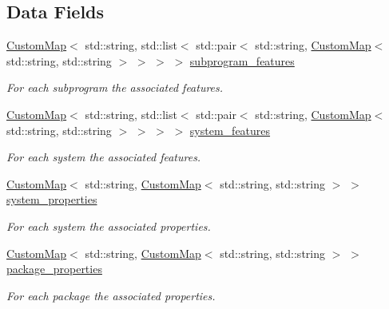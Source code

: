 \subsection*{Data Fields}
\begin{DoxyCompactItemize}
\item 
\hyperlink{custom__map_8hpp_a18ca01763abbe3e5623223bfe5aaac6b}{Custom\+Map}$<$ std\+::string, std\+::list$<$ std\+::pair$<$ std\+::string, \hyperlink{custom__map_8hpp_a18ca01763abbe3e5623223bfe5aaac6b}{Custom\+Map}$<$ std\+::string, std\+::string $>$ $>$ $>$ $>$ \hyperlink{structAadlParserData_a04950aa5522cb22c90023d3c7c2fefab}{subprogram\+\_\+features}
\begin{DoxyCompactList}\small\item\em For each subprogram the associated features. \end{DoxyCompactList}\item 
\hyperlink{custom__map_8hpp_a18ca01763abbe3e5623223bfe5aaac6b}{Custom\+Map}$<$ std\+::string, std\+::list$<$ std\+::pair$<$ std\+::string, \hyperlink{custom__map_8hpp_a18ca01763abbe3e5623223bfe5aaac6b}{Custom\+Map}$<$ std\+::string, std\+::string $>$ $>$ $>$ $>$ \hyperlink{structAadlParserData_aa8803edaa9b3f270b5ed4d3a8038aa98}{system\+\_\+features}
\begin{DoxyCompactList}\small\item\em For each system the associated features. \end{DoxyCompactList}\item 
\hyperlink{custom__map_8hpp_a18ca01763abbe3e5623223bfe5aaac6b}{Custom\+Map}$<$ std\+::string, \hyperlink{custom__map_8hpp_a18ca01763abbe3e5623223bfe5aaac6b}{Custom\+Map}$<$ std\+::string, std\+::string $>$ $>$ \hyperlink{structAadlParserData_a369138a227b82faab1eeacde070120be}{system\+\_\+properties}
\begin{DoxyCompactList}\small\item\em For each system the associated properties. \end{DoxyCompactList}\item 
\hyperlink{custom__map_8hpp_a18ca01763abbe3e5623223bfe5aaac6b}{Custom\+Map}$<$ std\+::string, \hyperlink{custom__map_8hpp_a18ca01763abbe3e5623223bfe5aaac6b}{Custom\+Map}$<$ std\+::string, std\+::string $>$ $>$ \hyperlink{structAadlParserData_aad068460d86339327e88d4a6e48a7d27}{package\+\_\+properties}
\begin{DoxyCompactList}\small\item\em For each package the associated properties. \end{DoxyCompactList}\item 

\end{DoxyCompactItemize}
